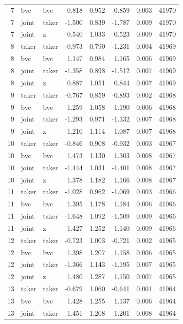 \begin{tabular}{rllrrrrr}
7 & bvc & bvc & 0.818 & 0.952 & 0.859 & 0.003 & 41970 \\
7 & joint & taker & -1.500 & 0.839 & -1.787 & 0.009 & 41970 \\
7 & joint & z & 0.540 & 1.033 & 0.523 & 0.009 & 41970 \\
8 & taker & taker & -0.973 & 0.790 & -1.231 & 0.004 & 41969 \\
8 & bvc & bvc & 1.147 & 0.984 & 1.165 & 0.006 & 41969 \\
8 & joint & taker & -1.358 & 0.898 & -1.512 & 0.007 & 41969 \\
8 & joint & z & 0.887 & 1.051 & 0.844 & 0.007 & 41969 \\
9 & taker & taker & -0.767 & 0.859 & -0.893 & 0.002 & 41968 \\
9 & bvc & bvc & 1.259 & 1.058 & 1.190 & 0.006 & 41968 \\
9 & joint & taker & -1.293 & 0.971 & -1.332 & 0.007 & 41968 \\
9 & joint & z & 1.210 & 1.114 & 1.087 & 0.007 & 41968 \\
10 & taker & taker & -0.846 & 0.908 & -0.932 & 0.003 & 41967 \\
10 & bvc & bvc & 1.473 & 1.130 & 1.303 & 0.008 & 41967 \\
10 & joint & taker & -1.444 & 1.031 & -1.401 & 0.008 & 41967 \\
10 & joint & z & 1.378 & 1.182 & 1.166 & 0.008 & 41967 \\
11 & taker & taker & -1.028 & 0.962 & -1.069 & 0.003 & 41966 \\
11 & bvc & bvc & 1.395 & 1.178 & 1.184 & 0.006 & 41966 \\
11 & joint & taker & -1.648 & 1.092 & -1.509 & 0.009 & 41966 \\
11 & joint & z & 1.427 & 1.252 & 1.140 & 0.009 & 41966 \\
12 & taker & taker & -0.723 & 1.003 & -0.721 & 0.002 & 41965 \\
12 & bvc & bvc & 1.398 & 1.207 & 1.158 & 0.006 & 41965 \\
12 & joint & taker & -1.366 & 1.143 & -1.195 & 0.007 & 41965 \\
12 & joint & z & 1.480 & 1.287 & 1.150 & 0.007 & 41965 \\
13 & taker & taker & -0.679 & 1.060 & -0.641 & 0.001 & 41964 \\
13 & bvc & bvc & 1.428 & 1.255 & 1.137 & 0.006 & 41964 \\
13 & joint & taker & -1.451 & 1.208 & -1.201 & 0.008 & 41964 \\

\end{tabular}
